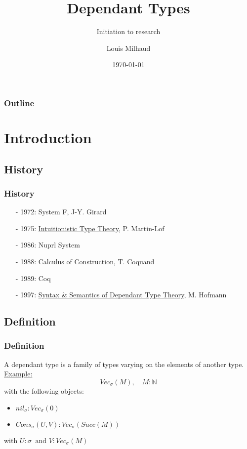 \documentclass[aspectratio=169]{beamer}
\title{Dependant Types}
\subtitle{Initiation to research}
\author{Louis Milhaud}
\institute{Université Paris Saclay}
\date{\today}
\newcommand{\N}{\mathbb{N}}
\begin{document}

    \begin{frame}
        \titlepage
    \end{frame}
    \begin{frame}
        \frametitle{Outline}
        \tableofcontents
    \end{frame}
    \section{Introduction}
    \subsection{History}
    \begin{frame}
        \frametitle{History}
        \begin{itemize}
            \item[-] 1972: System F, J-Y. Girard
            \item[-] 1975: \underline{Intuitionistic Type Theory}, P. Martin-Lof
            \item[-] 1986: Nuprl System
            \item[-] 1988: Calculus of Construction, T. Coquand  
            \item[-] 1989: Coq
            \item[-] 1997: \underline{Syntax \& Semantics of Dependant Type Theory}, M. Hofmann 
        \end{itemize}
    \end{frame}
    \subsection{Definition}
    \begin{frame}
        \frametitle{Definition}
        A dependant type is a family of types varying on the elements of another type.\\
        \vspace{20pt}
        \underline{Example:}\\
        $$Vec_\sigma(M),\quad M:\N $$
        with the following objects:
        \begin{itemize}
            \item $nil_\sigma : Vec_\sigma(0)$
            \item $Cons_\sigma(U, V) : Vec_\sigma(Succ(M))$ 
        \end{itemize}
        with $ U : \sigma\ \text{ and } V : Vec_\sigma(M)$
    \end{frame}
\end{document}
